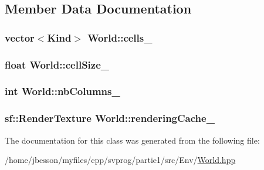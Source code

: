 \subsection{Member Data Documentation}
\hypertarget{class_world_a45190ce95669c7e323c44c2b19296c44}{
\subsubsection[{cells\-\_\-}]{\setlength{\rightskip}{0pt plus 5cm}vector$<${\bf Kind}$>$ World\-::cells\-\_\-\hspace{0.3cm}{\ttfamily [private]}}}\label{class_world_a45190ce95669c7e323c44c2b19296c44}
\hypertarget{class_world_aed8814e0c4693f42f57bfa267649ba78}{
\subsubsection[{cell\-Size\-\_\-}]{\setlength{\rightskip}{0pt plus 5cm}float World\-::cell\-Size\-\_\-\hspace{0.3cm}{\ttfamily [private]}}}\label{class_world_aed8814e0c4693f42f57bfa267649ba78}
\hypertarget{class_world_af977be110f600cba48f22b33e4e9ef72}{
\subsubsection[{nb\-Columns\-\_\-}]{\setlength{\rightskip}{0pt plus 5cm}int World\-::nb\-Columns\-\_\-\hspace{0.3cm}{\ttfamily [private]}}}\label{class_world_af977be110f600cba48f22b33e4e9ef72}
\hypertarget{class_world_a83f5c8e6be1d367d31d454d67f37436c}{
\subsubsection[{rendering\-Cache\-\_\-}]{\setlength{\rightskip}{0pt plus 5cm}sf\-::\-Render\-Texture World\-::rendering\-Cache\-\_\-\hspace{0.3cm}{\ttfamily [private]}}}\label{class_world_a83f5c8e6be1d367d31d454d67f37436c}


The documentation for this class was generated from the following file\-:\begin{DoxyCompactItemize}
\item 
/home/jbesson/myfiles/cpp/svprog/partie1/src/\-Env/\hyperlink{_world_8hpp}{World.\-hpp}\end{DoxyCompactItemize}
